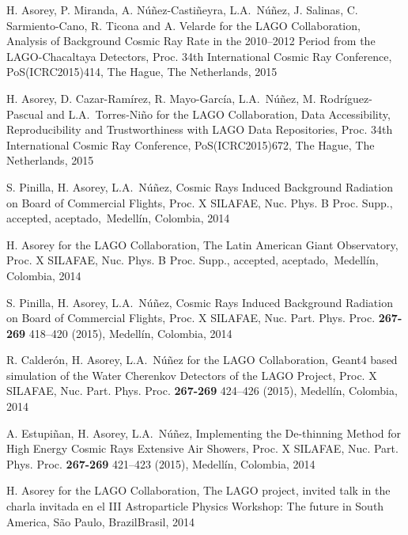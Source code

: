 \begin{etaremune}
\item {}H. Asorey, P. Miranda, A. Núñez-Castiñeyra, L.A.\ Núñez, J. Salinas, C. Sarmiento-Cano, R. Ticona and A. Velarde for the LAGO Collaboration, {{Analysis of Background Cosmic Ray Rate in the 2010--2012 Period from the LAGO-Chacaltaya Detectors}}, \en Proc.
34th International Cosmic Ray Conference, PoS(ICRC2015)414, The Hague, The Netherlands, 2015

\item {}H. Asorey, D. Cazar-Ramírez, R. Mayo-García, L.A.\ Núñez, M. Rodríguez-Pascual and L.A.\ Torres-Niño for the LAGO Collaboration, {{Data Accessibility, Reproducibility and Trustworthiness with LAGO Data Repositories}}, \en Proc.
34th International Cosmic Ray Conference, PoS(ICRC2015)672, The Hague, The Netherlands, 2015

\item {}S. Pinilla, H. Asorey, L.A.\ Núñez, {{Cosmic Rays Induced Background Radiation on Board of Commercial Flights}}, \en Proc.
X SILAFAE, Nuc.
Phys.
B Proc.
Supp., \ifeng accepted, \else aceptado,\fi\ Medellín, Colombia, 2014

\item {}H. Asorey for the LAGO Collaboration, {{The Latin American Giant Observatory}}, \en Proc.
X SILAFAE, Nuc.
Phys.
B Proc.
Supp., \ifeng accepted, \else aceptado,\fi\ Medellín, Colombia, 2014

\item {}S. Pinilla, H. Asorey, L.A.\ Núñez, {{Cosmic Rays Induced Background Radiation on Board of Commercial Flights}}, \en Proc.
X SILAFAE,  Nuc.
Part.
Phys.
Proc. {\textbf{267-269}} 418--420 (2015), Medellín, Colombia, 2014

\item {}R. Calderón, H. Asorey, L.A.\ Núñez for the LAGO Collaboration, {{Geant4 based simulation of the Water Cherenkov Detectors of the LAGO Project}}, \en Proc.
X SILAFAE, Nuc.
Part.
Phys.
Proc. {\textbf{267-269}} 424--426 (2015), Medellín, Colombia, 2014

\item {}A. Estupiñan, H. Asorey, L.A.\ Núñez, {{Implementing the De-thinning Method for High Energy Cosmic Rays Extensive Air Showers}}, \en Proc.
X SILAFAE, Nuc.
Part.
Phys.
Proc. {\textbf{267-269}} 421--423 (2015), Medellín, Colombia, 2014

\item {}H. Asorey for the LAGO Collaboration, {{The LAGO project}}, \ifeng invited talk in the \else charla invitada en el \fi III Astroparticle Physics Workshop: The future in South America, São Paulo, \ifeng Brazil\else Brasil\fi, 2014
  

\end{etaremune}
